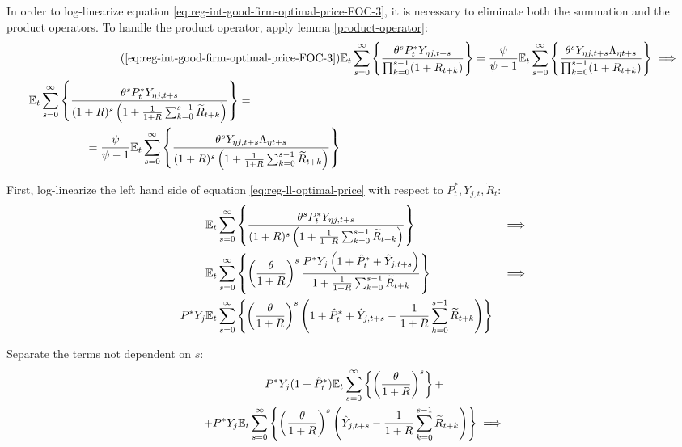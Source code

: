 \documentclass[
	thesis.tex
	]{subfiles}
\begin{document}
In order to log-linearize equation \ref{eq:reg-int-good-firm-optimal-price-FOC-3}, it is necessary to eliminate both the summation and the product operators. To handle the product operator, apply lemma \ref{product-operator}:
\begin{align}
	\tag{\ref{eq:reg-int-good-firm-optimal-price-FOC-3}}
	& \E \sum_{s=0}^{\infty} \left\{ \frac{\theta^s P_t^\ast Y_{\eta j,t+s} }{ \prod_{k=0}^{s-1}(1+R_{t+k})} \right\} = \frac{\psi}{\psi-1} \E \sum_{s=0}^{\infty} \left\{ \frac{\theta^s Y_{\eta j,t+s} \Lambda_{\eta t+s}}{\prod_{k=0}^{s-1}(1+R_{t+k})} \right\} \implies
	\\
	\begin{split}
		& \E \sum_{s=0}^{\infty} \left\{ \frac{\theta^s P_t^\ast Y_{\eta j,t+s}}{ (1 + R)^s \left( 1 + \frac{1}{1 + R} \sum_{k=0}^{s-1} \widetilde{R}_{t+k} \right) } \right\} = 
		\\ & \quad \quad \quad \quad \quad = \frac{\psi}{\psi-1} \E \sum_{s=0}^{\infty} \left\{ \frac{\theta^s Y_{\eta j,t+s} \Lambda_{\eta t+s}}{ (1 + R)^s \left( 1 + \frac{1}{1 + R} \sum_{k=0}^{s-1} \widetilde{R}_{t+k} \right) } \right\} \label{eq:reg-ll-optimal-price}
	\end{split}
\end{align}

First, log-linearize the left hand side of equation \ref{eq:reg-ll-optimal-price} with respect to \( P_t^\ast, Y_{j,t}, \widetilde{R}_t \):
\begin{alignat}{2}
	& {\mathbb{E}_{t}} \sum_{s=0}^{\infty} \left\{ \frac{\theta^s P_t^\ast Y_{\eta j,t+s}}{ (1 + R)^s \left( 1 + \frac{1}{1 + R} \sum_{k=0}^{s-1} \widetilde{R}_{t+k} \right) } \right\} &\implies \nonumber \\
	& {\mathbb{E}_{t}} \sum_{s=0}^{\infty} \left\{ \left( \frac{\theta}{1 + R} \right)^s  \frac{ P^\ast Y_{j} \left( 1 + \hat{P}_t^\ast + \hat{Y}_{j,t+s} \right) }{ 1 + \frac{1}{1 + R} \sum_{k=0}^{s-1} \widetilde{R}_{t+k} } \right\} &\implies \nonumber \\
	P^\ast Y_{j} &{\mathbb{E}_{t}} \sum_{s=0}^{\infty} \left\{ \left( \frac{\theta}{1 + R} \right)^s \left( 1 + \hat{P}_t^\ast + \hat{Y}_{j,t+s} - \frac{1}{1 + R} \sum_{k=0}^{s-1} \widetilde{R}_{t+k} \right) \right\} & \nonumber
\end{alignat}

Separate the terms not dependent on $s$:
\begin{multline}
	P^\ast Y_{j} ( 1 + \hat{P}_t^\ast ) {\mathbb{E}_{t}} \sum_{s=0}^{\infty} \left\{ \left( \frac{\theta}{1 + R} \right)^s \right\} + \\
	+ P^\ast Y_{j} {\mathbb{E}_{t}} \sum_{s=0}^{\infty} \left\{ \left( \frac{\theta}{1 + R} \right)^s \left( \hat{Y}_{j,t+s} - \frac{1}{1 + R} \sum_{k=0}^{s-1} \widetilde{R}_{t+k} \right) \right\} \implies \nonumber
\end{multline}
\end{document}

